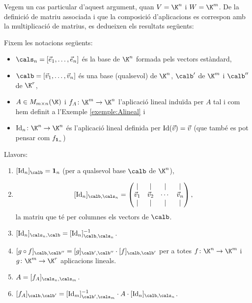 Vegem un cas particular d'aquest argument, quan $V=\K^n$ i $W=\K^m$. De la definició de matriu associada i que la composició d'aplicacions es correspon amb la multiplicació de matrius, es dedueixen els resultats següents:
\begin{proposicio}\label{prop:canvibase}
    Fixem les notacions següents:
    \begin{itemize}
        \item $\cals_n=[\vec e_1, \dots, \vec e_n]$ és la base de $\K^n$ formada pels vectors estàndard,
        \item $\calb=[\vec v_1, \dots,\vec v_n]$ és una base (qualsevol) de $\K^n$, $\calb'$ de $\K^m$ i $\calb''$ de $\K^r$,
        \item $A\in M_{m\times n}(\K)$ i $f_A\colon \K^m\to \K^n$ l'aplicació lineal induïda per $A$ tal i com hem definit a l'Exemple \ref{exemple:Alineal} i
        \item $\Id_n\colon\K^n \to \K^n$ és l'aplicació lineal definida per $\operatorname{Id}(\vec v)=\vec v$ (que també es pot pensar com $f_{\mathbf{1}_n}$)
    \end{itemize}
    Llavors:
    \begin{enumerate}[\rm (a)]
        \item $[\Id_n]_{\calb}=\1_n$ (per a qualsevol base $\calb$ de $\K^n$),
        \item $$[\Id_n]_{\calb,\cals_n}=	\begin{pmatrix}
        	\mid & \mid &\mid & \mid\\
        	\vec v_1 & \vec v_2 &\cdots&\vec v_n\\
        	\mid & \mid &\mid & \mid
        	\end{pmatrix}, $$
        	la matriu que té per columnes els vectors de $\calb$.
        \item $[\Id_n]_{\cals_n,\calb}=[\Id_n]_{\calb,\cals_n}^{-1}$.
        \item $[g\circ f]_{\calb,\calb''}=[g]_{\calb',\calb''}\cdot[f]_{\calb,\calb'}$ per a totes $f\colon \K^n\to \K^m$ i $g\colon \K^m\to\K^r$ aplicacions lineals.
        \item $A=[f_A]_{\cals_n,\cals_m}$.
        \item $[f_A]_{\calb,\calb'}= [\Id_m]_{\calb',\cals_m}^{-1} \cdot A \cdot [\Id_n]_{\calb,\cals_n}$.
    \end{enumerate}
\end{proposicio}

